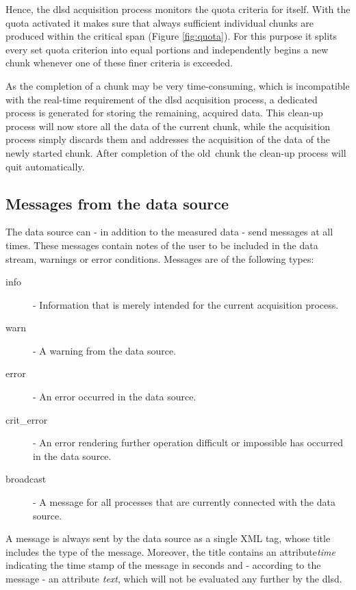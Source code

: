 \documentclass[a4paper,12pt,BCOR6mm,bibtotoc,idxtotoc]{scrbook}
\begin{document}
Hence, the dlsd acquisition process monitors the quota criteria for itself. With the quota activated it makes sure that always sufficient individual chunks are produced within the critical span (Figure \ref{fig:quota}). For this purpose it splits every set quota criterion into equal portions and independently begins a new chunk whenever one of these finer criteria is exceeded.

As the completion of a chunk may be very time-consuming, which is incompatible with the real-time requirement of the dlsd acquisition process, a dedicated process is generated for storing the remaining, acquired data. This \glqq clean-up process \grqq\index{} will now store all the data of the current chunk, while the acquisition process simply discards them and addresses the acquisition of the data of the newly started chunk. After completion of the \glqq old\grqq\ chunk the clean-up process will quit automatically.


\subsection{Messages from the data source} \label{sec:dlsd_logger_msg}

The data source can - in addition to the measured data - send messages at all times. These messages contain notes of the user to be included in the data stream, warnings or error conditions. Messages are of the following types:

\begin{description} 
\item[info] - Information that is merely intended for the current acquisition process. 
\item[warn] - A warning from the data source. 
\item[error] - An error occurred in the data source. 
\item[crit\_error] - An error rendering further operation difficult or impossible has occurred in the data source. 
\item[broadcast] - A message for all processes that are currently connected with the data source. \end{description}

A message is always sent by the data source as a single XML tag, whose title includes the type of the message. Moreover, the title contains an attribute\textit{time} indicating the time stamp of the message in seconds and - according to the message - an attribute \textit{text}, which will not be evaluated any further by the dlsd.
\end{document}
